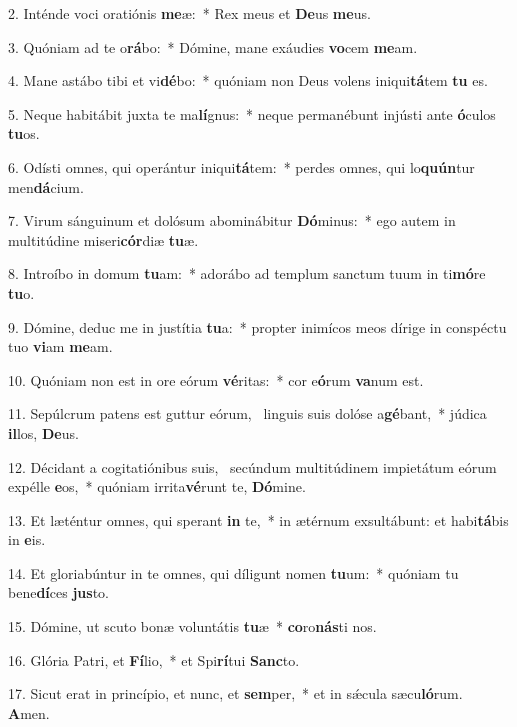 2. Inténde voci oratiónis \textbf{me}æ:~*  Rex meus et \textbf{De}us \textbf{me}us.\

3. Quóniam ad te o\textbf{rá}bo:~*  Dómine, mane exáudies \textbf{vo}cem \textbf{me}am.\

4. Mane astábo tibi et vi\textbf{dé}bo:~*  quóniam non Deus volens iniqui\textbf{tá}tem \textbf{tu} es.\

5. Neque habitábit juxta te ma\textbf{lí}gnus:~*  neque permanébunt injústi ante \textbf{ó}culos \textbf{tu}os.\

6. Odísti omnes, qui operántur iniqui\textbf{tá}tem:~*  perdes omnes, qui lo\textbf{quún}tur men\textbf{dá}cium.\

7. Virum sánguinum et dolósum abominábitur \textbf{Dó}minus:~*  ego autem in multitúdine miseri\textbf{cór}diæ \textbf{tu}æ.\

8. Introíbo in domum \textbf{tu}am:~*  adorábo ad templum sanctum tuum in ti\textbf{mó}re \textbf{tu}o.\

9. Dómine, deduc me in justítia \textbf{tu}a:~*  propter inimícos meos dírige in conspéctu tuo \textbf{vi}am \textbf{me}am.\

10. Quóniam non est in ore eórum \textbf{vé}ritas:~*  cor e\textbf{ó}rum \textbf{va}num est.\

11. Sepúlcrum patens est guttur eórum, \dag\  linguis suis dolóse a\textbf{gé}bant,~*  júdica \textbf{il}los, \textbf{De}us.\

12. Décidant a cogitatiónibus suis, \dag\  secúndum multitúdinem impietátum eórum expélle \textbf{e}os,~*  quóniam irrita\textbf{vé}runt te, \textbf{Dó}mine.\

13. Et læténtur omnes, qui sperant \textbf{in} te,~*  in ætérnum exsultábunt: et habi\textbf{tá}bis in \textbf{e}is.\

14. Et gloriabúntur in te omnes, qui díligunt nomen \textbf{tu}um:~*  quóniam tu bene\textbf{dí}ces \textbf{jus}to.\

15. Dómine, ut scuto bonæ voluntátis \textbf{tu}æ~*  \textbf{co}ro\textbf{nás}ti nos.\

16. Glória Patri, et \textbf{Fí}lio,~*  et Spi\textbf{rí}tui \textbf{Sanc}to.\

17. Sicut erat in princípio, et nunc, et \textbf{sem}per,~*  et in sǽcula sæcu\textbf{ló}rum. \textbf{A}men.\

